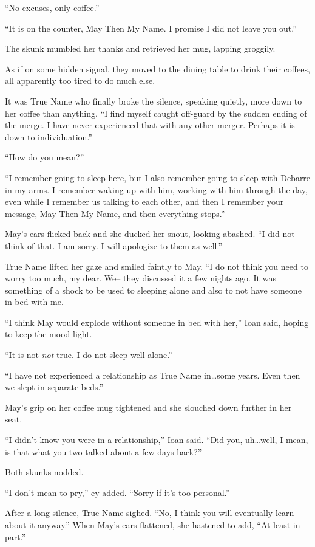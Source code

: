 ``No excuses, only coffee.''

``It is on the counter, May Then My Name. I promise I did not leave you out.''

The skunk mumbled her thanks and retrieved her mug, lapping groggily.

As if on some hidden signal, they moved to the dining table to drink their coffees, all apparently too tired to do much else.

It was True Name who finally broke the silence, speaking quietly, more down to her coffee than anything. ``I find myself caught off-guard by the sudden ending of the merge. I have never experienced that with any other merger. Perhaps it is down to individuation.''

``How do you mean?''

``I remember going to sleep here, but I also remember going to sleep with Debarre in my arms. I remember waking up with him, working with him through the day, even while I remember us talking to each other, and then I remember your message, May Then My Name, and then everything stops.''

May's ears flicked back and she ducked her snout, looking abashed. ``I did not think of that. I am sorry. I will apologize to them as well.''

True Name lifted her gaze and smiled faintly to May. ``I do not think you need to worry too much, my dear. We-- they discussed it a few nights ago. It was something of a shock to be used to sleeping alone and also to not have someone in bed with me.

``I think May would explode without someone in bed with her,'' Ioan said, hoping to keep the mood light.

``It is not \emph{not} true. I do not sleep well alone.''

``I have not experienced a relationship as True Name in\ldots some years. Even then we slept in separate beds.''

May's grip on her coffee mug tightened and she slouched down further in her seat.

``I didn't know you were in a relationship,'' Ioan said. ``Did you, uh\ldots well, I mean, is that what you two talked about a few days back?''

Both skunks nodded.

``I don't mean to pry,'' ey added. ``Sorry if it's too personal.''

After a long silence, True Name sighed. ``No, I think you will eventually learn about it anyway.'' When May's ears flattened, she hastened to add, ``At least in part.''

